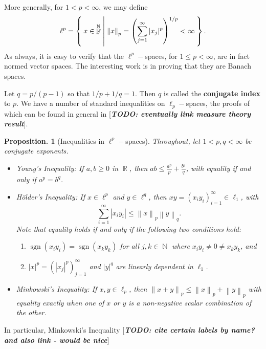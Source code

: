 \documentclass[11pt, a4paper]{memoir}
\DeclareMathOperator{\N}{{\mathbb{N}}}
\DeclareMathOperator{\R}{{\mathbb{R}}}
\DeclareMathOperator{\F}{{\mathbb{F}}}
\newcommand{\norm}[1]{\ensuremath{\left\lVert#1\right\rVert}}
\newcommand{\abs}[1]{\ensuremath{\left\lvert#1\right\rvert}}
\theoremstyle{change}
\newtheorem{proposition}[theorem]{Proposition.}
\theoremstyle{plain}
\theoremstyle{nonumberplain}
\DeclareMathOperator{\sgn}{sgn}
\newcommand{\TODO}[1]{[\textit{\textbf{TODO: #1}}]}
\newcommand{\lp}[1]{\ensuremath{\ell^{#1}}}
\numberwithin{equation}{section}
\begin{document}
More generally, for $1<p<\infty$, we may define
\begin{equation*}
    \lp{p}=\Set{x\in\F^{\N} |\norm{x}_p=\left(\sum_{j=1}^\infty|x_j|^p\right)^{1/p}<\infty}.
\end{equation*}
As always, it is easy to verify that the $\lp{p}-$spaces, for $1\leq p<\infty$, are in fact normed vector spaces.
The interesting work is in proving that they are Banach spaces.

Let $q=p/(p-1)$ so that $1/p+1/q=1$.
Then $q$ is called the \textbf{conjugate index} to $p$.
We have a number of standard inequalities on $\ell_p-$spaces, the proofs of which can be found in general in \TODO{eventually link measure theory result}.
\begin{proposition}[Inequalities in $\lp{p}-$spaces]
    Throughout, let $1<p,q<\infty$ be conjugate exponents.
    \begin{itemize}
        \item \textit{Young's Inequality:} If $a,b\geq 0$ in $\R$, then $ab\leq \frac{a^p}{p}+\frac{b^q}{q}$, with equality if and only if $a^p=b^q$.
        \item \textit{Hölder's Inequality:} If $x\in\lp{p}$ and $y\in\lp{q}$, then $xy=(x_iy_i)_{i=1}^\infty\in\ell_1$, with
            \begin{equation*}
                \sum_{i=1}^\infty \abs{x_iy_i}\leq\norm{x}_p\norm{y}_q.
            \end{equation*}
            Note that equality holds if and only if the following two conditions hold:
            \begin{enumerate}[nl,r]
                \item $\sgn(x_iy_i)=\sgn(x_ky_k)$ for all $j,k\in\N$ where $x_iy_i\neq 0\neq x_ky_k$, and
                \item $|x|^p=(|x_j|^p)_{j=1}^\infty$ and $|y|^q$ are linearly dependent in $\ell_1$.
            \end{enumerate}
        \item \textit{Minkowski's Inequality:} If $x,y\in\ell_p$, then $\norm{x+y}_p\leq\norm{x}_p+\norm{y}_p$ with equality exactly when one of $x$ or $y$ is a non-negative scalar combination of the other.
    \end{itemize}
\end{proposition}
In particular, Minkowski's Inequality \TODO{cite certain labels by name? and also link - would be nice}
\end{document}
